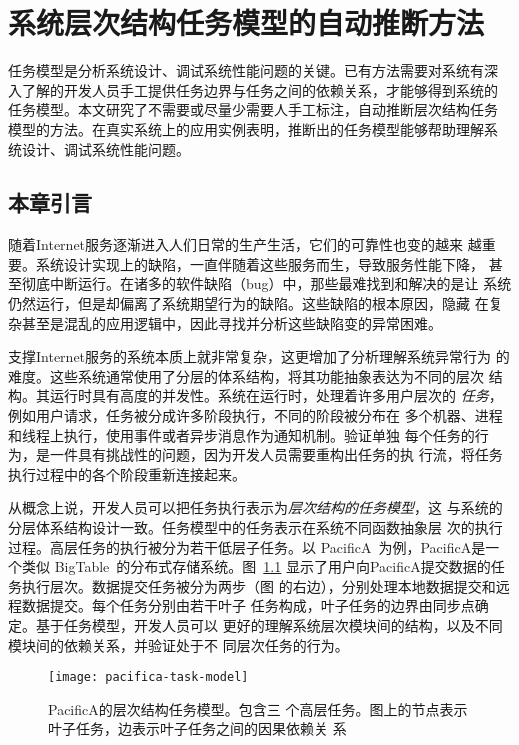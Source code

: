 \chapter{系统层次结构任务模型的自动推断方法}
\label{chap:scalpel}

任务模型是分析系统设计、调试系统性能问题的关键。已有方法需要对系统有深
入了解的开发人员手工提供任务边界与任务之间的依赖关系，才能够得到系统的
任务模型。本文研究了不需要或尽量少需要人手工标注，自动推断层次结构任务
模型的方法。在真实系统上的应用实例表明，推断出的任务模型能够帮助理解系
统设计、调试系统性能问题。

\section{本章引言}

随着Internet服务逐渐进入人们日常的生产生活，它们的可靠性也变的越来
越重要。系统设计实现上的缺陷，一直伴随着这些服务而生，导致服务性能下降，
甚至彻底中断运行。在诸多的软件缺陷（bug）中，那些最难找到和解决的是让
系统仍然运行，但是却偏离了系统期望行为的缺陷。这些缺陷的根本原因，隐藏
在复杂甚至是混乱的应用逻辑中，因此寻找并分析这些缺陷变的异常困难。

支撑Internet服务的系统本质上就非常复杂，这更增加了分析理解系统异常行为
的难度。这些系统通常使用了分层的体系结构，将其功能抽象表达为不同的层次
结构。其运行时具有高度的并发性。系统在运行时，处理着许多用户层次的
\emph{任务}，例如用户请求，任务被分成许多阶段执行，不同的阶段被分布在
多个机器、进程和线程上执行，使用事件或者异步消息作为通知机制。验证单独
每个任务的行为，是一件具有挑战性的问题，因为开发人员需要重构出任务的执
行流，将任务执行过程中的各个阶段重新连接起来。

从概念上说，开发人员可以把任务执行表示为\emph{层次结构的任务模型}，这
与系统的分层体系结构设计一致。任务模型中的任务表示在系统不同函数抽象层
次的执行过程。高层任务的执行被分为若干低层子任务。以
PacificA~\cite{pacifica}为例，PacificA是一个类似
BigTable~\cite{bigtable}的分布式存储系统。图~\ref{fig:pacifica_model}
显示了用户向PacificA提交数据的任务执行层次。数据提交任务被分为两步（图
的右边），分别处理本地数据提交和远程数据提交。每个任务分别由若干{叶子
任务}构成，叶子任务的边界由{同步点}确定。基于任务模型，开发人员可以
更好的理解系统层次模块间的结构，以及不同模块间的依赖关系，并验证处于不
同层次任务的行为。

\begin{figure}[htbp]
  \centering
  \begin{minipage}{1.0\linewidth}
    \centering
    \texttt{[image: pacifica-task-model]}
    \parbox{0.8\linewidth}{\caption{PacificA的层次结构任务模型。包含三
    个高层任务。图上的节点表示叶子任务，边表示叶子任务之间的因果依赖关
    系}
    \label{fig:pacifica_model}}
  \end{minipage}
\end{figure}

